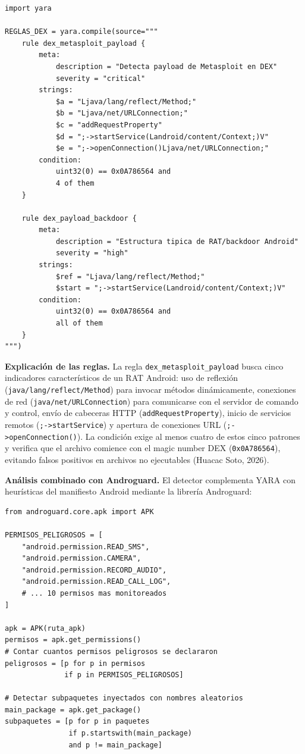 \documentclass[12pt,a4paper]{article}
\begin{document}
\begin{lstlisting}[caption={Reglas YARA para detección de payload Metasploit en DEX de APK},
                   label=lst:yara_dex]
import yara

REGLAS_DEX = yara.compile(source="""
    rule dex_metasploit_payload {
        meta:
            description = "Detecta payload de Metasploit en DEX"
            severity = "critical"
        strings:
            $a = "Ljava/lang/reflect/Method;"
            $b = "Ljava/net/URLConnection;"
            $c = "addRequestProperty"
            $d = ";->startService(Landroid/content/Context;)V"
            $e = ";->openConnection()Ljava/net/URLConnection;"
        condition:
            uint32(0) == 0x0A786564 and
            4 of them
    }

    rule dex_payload_backdoor {
        meta:
            description = "Estructura tipica de RAT/backdoor Android"
            severity = "high"
        strings:
            $ref = "Ljava/lang/reflect/Method;"
            $start = ";->startService(Landroid/content/Context;)V"
        condition:
            uint32(0) == 0x0A786564 and
            all of them
    }
""")
\end{lstlisting}

\textbf{Explicación de las reglas.} La regla
\texttt{dex\_metasploit\_payload} busca cinco indicadores
característicos de un RAT Android: uso de reflexión
(\texttt{java/lang/reflect/Method}) para invocar métodos dinámicamente,
conexiones de red (\texttt{java/net/URLConnection}) para comunicarse con
el servidor de comando y control, envío de cabeceras HTTP
(\texttt{addRequestProperty}), inicio de servicios remotos
(\texttt{;->startService}) y apertura de conexiones URL
(\texttt{;->openConnection()}). La condición exige al menos cuatro de
estos cinco patrones y verifica que el archivo comience con el magic
number DEX (\texttt{0x0A786564}), evitando falsos positivos en archivos
no ejecutables (Huacac Soto, 2026).

\textbf{Análisis combinado con Androguard.} El detector complementa
YARA con heurísticas del manifiesto Android mediante la librería
Androguard:

\begin{lstlisting}[caption={Análisis heurístico del AndroidManifest con Androguard},
                   label=lst:androguard]
from androguard.core.apk import APK

PERMISOS_PELIGROSOS = [
    "android.permission.READ_SMS",
    "android.permission.CAMERA",
    "android.permission.RECORD_AUDIO",
    "android.permission.READ_CALL_LOG",
    # ... 10 permisos mas monitoreados
]

apk = APK(ruta_apk)
permisos = apk.get_permissions()
# Contar cuantos permisos peligrosos se declararon
peligrosos = [p for p in permisos
              if p in PERMISOS_PELIGROSOS]

# Detectar subpaquetes inyectados con nombres aleatorios
main_package = apk.get_package()
subpaquetes = [p for p in paquetes
               if p.startswith(main_package)
               and p != main_package]
\end{lstlisting}
\end{document}

